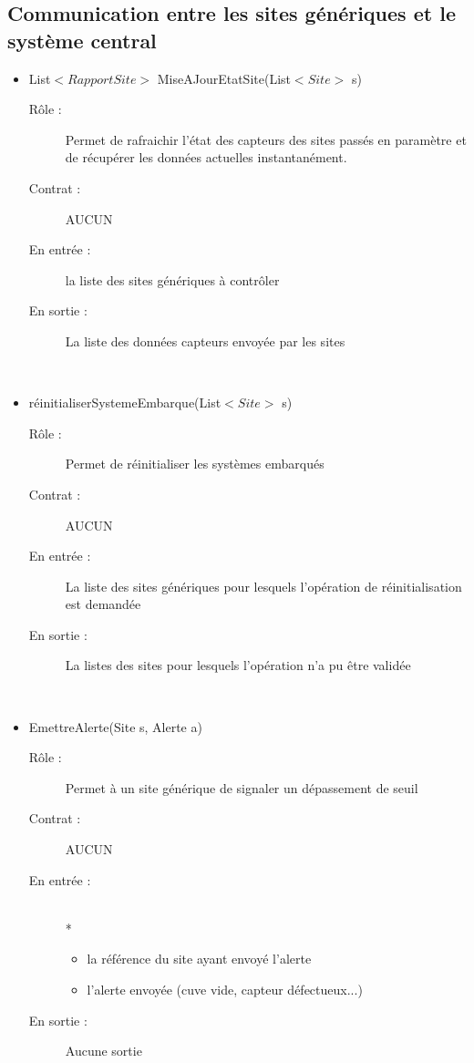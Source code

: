 \subsection{Communication entre les sites génériques et le système central}
\begin{itemize}
	\item List$<RapportSite>$ MiseAJourEtatSite(List$<Site>$  s) 
	\begin{description} 
		\item[Rôle :] Permet de rafraichir l'état des capteurs des sites passés en paramètre et de récupérer les données actuelles instantanément.
		\item[Contrat :] AUCUN 
		\item[En entrée :] la liste des sites génériques à contrôler
		\item[En sortie :] La liste des données capteurs envoyée par les sites
	\end{description}
	~\\
	\item réinitialiserSystemeEmbarque(List$<Site>$  s) 
	\begin{description} 
		\item[Rôle :] Permet de réinitialiser les systèmes embarqués
		\item[Contrat :] AUCUN
		\item[En entrée :] La liste des sites génériques pour lesquels l'opération de réinitialisation est demandée
		\item[En sortie :] La listes des sites pour lesquels l'opération n'a pu être validée 
	\end{description}
	~\\
	\item EmettreAlerte(Site s, Alerte a) 
	\begin{description} 
		\item[Rôle :] Permet à un site générique de signaler un dépassement de seuil
		\item[Contrat :] AUCUN
		\item[En entrée :] 
		~\\*
		\begin{itemize}
			\item la référence du site ayant envoyé l'alerte
			\item l'alerte envoyée (cuve vide, capteur défectueux...)
		\end{itemize}
		\item[En sortie :] Aucune sortie
	\end{description}
	~\\

\end{itemize}
